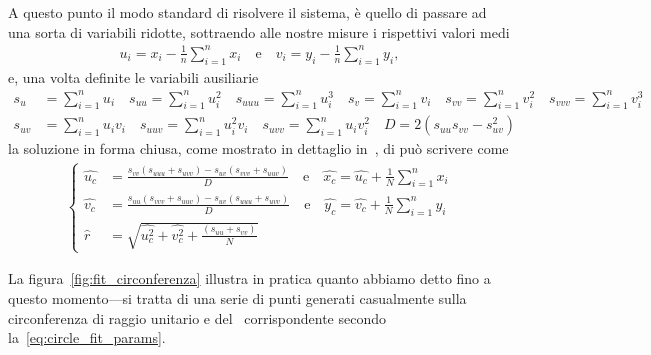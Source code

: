 A questo punto il modo standard di risolvere il sistema, è quello di passare ad
una sorta di variabili ridotte, sottraendo alle nostre misure i rispettivi valori medi
\begin{align*}
  u_i = x_i - \frac{1}{n} \sum_{i=1}^n x_i
  \quad \text{e} \quad
  v_i = y_i - \frac{1}{n} \sum_{i=1}^n y_i,
\end{align*}
e, una volta definite le variabili ausiliarie
\begin{align*}
  s_u &= \sum_{i=1}^n u_i \quad s_{uu} = \sum_{i=1}^n u_i^2 \quad s_{uuu} = \sum_{i=1}^n u_i^3\quad
  s_v = \sum_{i=1}^n v_i \quad s_{vv} = \sum_{i=1}^n v_i^2 \quad s_{vvv} = \sum_{i=1}^n v_i^3\\
  s_{uv} &= \sum_{i=1}^n u_i v_i \quad s_{uuv} = \sum_{i=1}^n u_i^2 v_i \quad
  s_{uvv} = \sum_{i=1}^n u_i v_i^2 \quad D = 2 (s_{uu} s_{vv} - s_{uv}^2)
\end{align*}
la soluzione in forma chiusa, come mostrato in dettaglio in~\cite{kasawriteup},
di può scrivere come
\begin{align}\label{eq:circle_fit_params}
  \begin{cases}
    \hat{u_c} &= \displaystyle\frac{s_{vv} (s_{uuu} + s_{uvv}) - s_{uv} (s_{vvv} + s_{uuv})}{D}
    \quad \text{e} \quad \hat{x_c} = \hat{u_c} + \frac{1}{N} \sum_{i=1}^n x_i\\
    \hat{v_c} &= \displaystyle\frac{s_{uu} (s_{vvv} + s_{uuv}) - s_{uv} (s_{uuu} + s_{uvv})}{D}
    \quad \text{e} \quad \hat{y_c} = \hat{v_c} + \frac{1}{N} \sum_{i=1}^n y_i\\
    \hat{r} &= \displaystyle \sqrt{\hat{u_c^2} + \hat{v_c^2} + \frac{(s_{uu} + s_{vv})}{N}}
  \end{cases}
\end{align}


La figura~\ref{fig:fit_circonferenza} illustra in pratica quanto abbiamo detto
fino a questo momento---si tratta di una serie di punti generati casualmente sulla
circonferenza di raggio unitario e del \fit\ corrispondente secondo
la~\ref{eq:circle_fit_params}.

